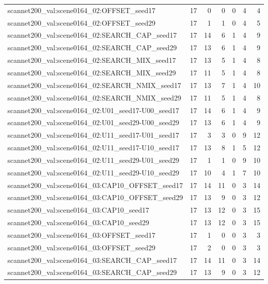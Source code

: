 \begin{table}[t]
\begin{tabular}{lrrrrrr}
scannet200\_val:scene0164\_02:OFFSET\_seed17 & 17 & 0 & 0 & 0 & 4 & 4 \\
scannet200\_val:scene0164\_02:OFFSET\_seed29 & 17 & 1 & 1 & 0 & 4 & 5 \\
scannet200\_val:scene0164\_02:SEARCH\_CAP\_seed17 & 17 & 14 & 6 & 1 & 4 & 9 \\
scannet200\_val:scene0164\_02:SEARCH\_CAP\_seed29 & 17 & 13 & 6 & 1 & 4 & 9 \\
scannet200\_val:scene0164\_02:SEARCH\_MIX\_seed17 & 17 & 13 & 5 & 1 & 4 & 8 \\
scannet200\_val:scene0164\_02:SEARCH\_MIX\_seed29 & 17 & 11 & 5 & 1 & 4 & 8 \\
scannet200\_val:scene0164\_02:SEARCH\_NMIX\_seed17 & 17 & 13 & 7 & 1 & 4 & 10 \\
scannet200\_val:scene0164\_02:SEARCH\_NMIX\_seed29 & 17 & 11 & 5 & 1 & 4 & 8 \\
scannet200\_val:scene0164\_02:U01\_seed17-U00\_seed17 & 17 & 14 & 6 & 1 & 4 & 9 \\
scannet200\_val:scene0164\_02:U01\_seed29-U00\_seed29 & 17 & 13 & 6 & 1 & 4 & 9 \\
scannet200\_val:scene0164\_02:U11\_seed17-U01\_seed17 & 17 & 3 & 3 & 0 & 9 & 12 \\
scannet200\_val:scene0164\_02:U11\_seed17-U10\_seed17 & 17 & 13 & 8 & 1 & 5 & 12 \\
scannet200\_val:scene0164\_02:U11\_seed29-U01\_seed29 & 17 & 1 & 1 & 0 & 9 & 10 \\
scannet200\_val:scene0164\_02:U11\_seed29-U10\_seed29 & 17 & 10 & 4 & 1 & 7 & 10 \\
scannet200\_val:scene0164\_03:CAP10\_OFFSET\_seed17 & 17 & 14 & 11 & 0 & 3 & 14 \\
scannet200\_val:scene0164\_03:CAP10\_OFFSET\_seed29 & 17 & 13 & 9 & 0 & 3 & 12 \\
scannet200\_val:scene0164\_03:CAP10\_seed17 & 17 & 13 & 12 & 0 & 3 & 15 \\
scannet200\_val:scene0164\_03:CAP10\_seed29 & 17 & 13 & 12 & 0 & 3 & 15 \\
scannet200\_val:scene0164\_03:OFFSET\_seed17 & 17 & 1 & 0 & 0 & 3 & 3 \\
scannet200\_val:scene0164\_03:OFFSET\_seed29 & 17 & 2 & 0 & 0 & 3 & 3 \\
scannet200\_val:scene0164\_03:SEARCH\_CAP\_seed17 & 17 & 14 & 11 & 0 & 3 & 14 \\
scannet200\_val:scene0164\_03:SEARCH\_CAP\_seed29 & 17 & 13 & 9 & 0 & 3 & 12 \\

\end{tabular}
\end{table}
